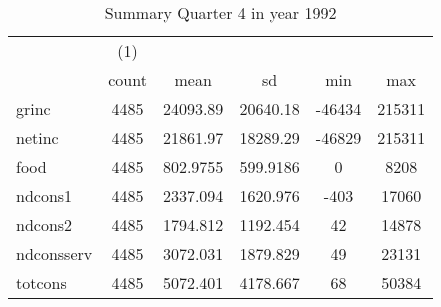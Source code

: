 \begin{table}[htbp]\centering
\def\sym#1{\ifmmode^{#1}\else\(^{#1}\)\fi}
\caption{Summary Quarter 4 in year 1992 \label{sum\_Q4\_y1992}}
\begin{tabular}{l*{1}{ccccc}}
\hline\hline
            &\multicolumn{1}{c}{(1)}&            &            &            &            \\
            &       count&        mean&          sd&         min&         max\\
\hline
grinc       &        4485&    24093.89&    20640.18&      -46434&      215311\\
netinc      &        4485&    21861.97&    18289.29&      -46829&      215311\\
food        &        4485&    802.9755&    599.9186&           0&        8208\\
ndcons1     &        4485&    2337.094&    1620.976&        -403&       17060\\
ndcons2     &        4485&    1794.812&    1192.454&          42&       14878\\
ndconsserv  &        4485&    3072.031&    1879.829&          49&       23131\\
totcons     &        4485&    5072.401&    4178.667&          68&       50384\\
\hline\hline
\end{tabular}
\end{table}
